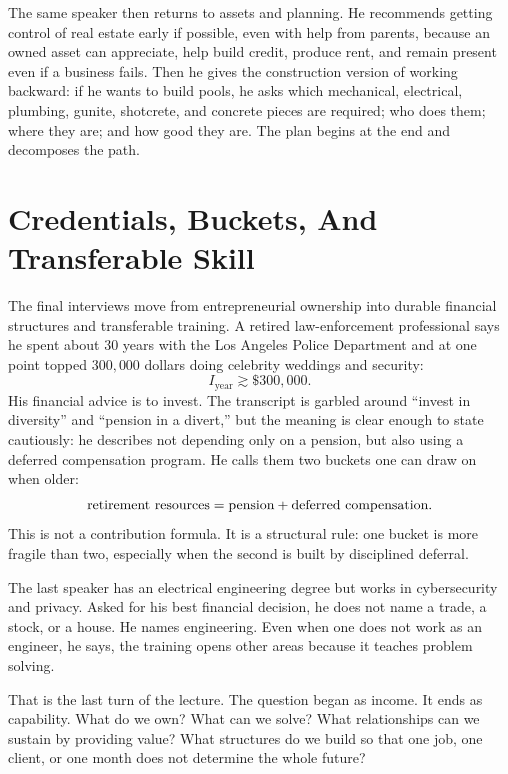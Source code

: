 The same speaker then returns to assets and planning. He recommends getting control of real estate early if possible, even with help from parents, because an owned asset can appreciate, help build credit, produce rent, and remain present even if a business fails. Then he gives the construction version of working backward: if he wants to build pools, he asks which mechanical, electrical, plumbing, gunite, shotcrete, and concrete pieces are required; who does them; where they are; and how good they are. The plan begins at the end and decomposes the path.

\section{Credentials, Buckets, And Transferable Skill}

The final interviews move from entrepreneurial ownership into durable financial structures and transferable training. A retired law-enforcement professional says he spent about \(30\) years with the Los Angeles Police Department and at one point topped \(300{,}000\) dollars doing celebrity weddings and security:
\begin{equation}
I_{\mathrm{year}} \gtrsim \$300{,}000.
\end{equation}
His financial advice is to invest. The transcript is garbled around ``invest in diversity'' and ``pension in a divert,'' but the meaning is clear enough to state cautiously: he describes not depending only on a pension, but also using a deferred compensation program. He calls them two buckets one can draw on when older:
\begin{equation}
\hbox{retirement resources}
=
\hbox{pension}
+
\hbox{deferred compensation}.
\end{equation}
This is not a contribution formula. It is a structural rule: one bucket is more fragile than two, especially when the second is built by disciplined deferral.

The last speaker has an electrical engineering degree but works in cybersecurity and privacy. Asked for his best financial decision, he does not name a trade, a stock, or a house. He names engineering. Even when one does not work as an engineer, he says, the training opens other areas because it teaches problem solving.

That is the last turn of the lecture. The question began as income. It ends as capability. What do we own? What can we solve? What relationships can we sustain by providing value? What structures do we build so that one job, one client, or one month does not determine the whole future?

